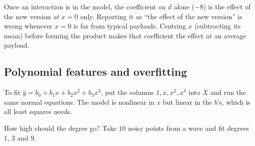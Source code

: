 \begin{trapbox}
Once an interaction is in the model, the coefficient on $d$ alone ($-8$) is the effect of
the new version \emph{at $x=0$} only. Reporting it as ``the effect of the new version''
is wrong whenever $x=0$ is far from typical payloads. Centring $x$ (subtracting its mean)
before forming the product makes that coefficient the effect at an average payload.
\end{trapbox}

\subsection{Polynomial features and overfitting}

To fit $\hat y = b_0 + b_1x + b_2x^2 + b_3x^3$, put the
columns $1, x, x^2, x^3$ into $X$ and run the same normal equations. The model is
nonlinear in $x$ but linear in the $b$'s, which is all least squares needs.

How high should the degree go? Take $10$ noisy points from a wave and fit degrees $1$,
$3$ and $9$.

